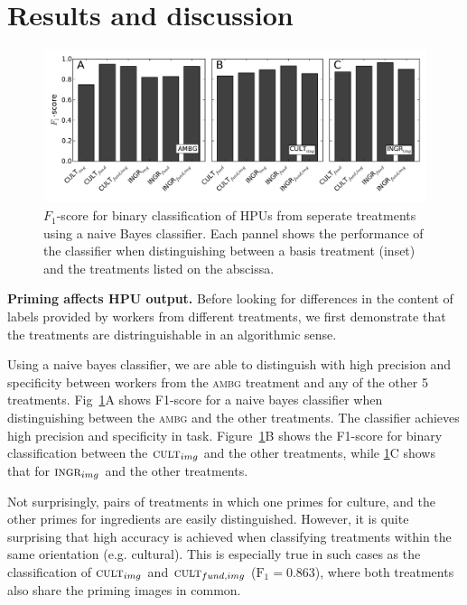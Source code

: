 \documentclass[letterpaper, 11pt, twocolumn]{article}
\begin{document}
\section*{Results and discussion}

\begin{figure}
	\begin{center}
		\includegraphics[scale=0.55]{../figs/f1scores.pdf}
		\caption{$F_1$-score for binary classification of HPUs from seperate
			treatments using a naive Bayes classifier.  Each pannel shows
			the performance of the classifier when distinguishing between 
			a basis treatment (inset) and the treatments listed on the 
			abscissa.
		}
		\label{fig:classifier}
	\end{center}
\end{figure}

\textbf{Priming affects HPU output.}
Before looking for differences in the content of labels provided by workers
from different treatments, we first demonstrate that the treatments are
distringuishable in an algorithmic sense.

Using a naive bayes classifier, we are able to distinguish with high precision
and specificity between workers from the \textsc{ambg} treatment and any of
the other 5 treatments.  Fig~\ref{fig:classifier}A shows F1-score for a
naive bayes classifier when distinguishing between the \textsc{ambg} and 
the other treatments. The classifier achieves high precision and specificity
in task.  Figure~\ref{fig:classifier}B shows the F1-score for binary
classification between the $\textsc{cult}_{img}$ and the other treatments, 
while \ref{fig:classifier}C shows that for $\textsc{ingr}_{img}$ and the other
treatments.  

Not surprisingly, pairs of treatments in which one primes for culture, and the
other primes for ingredients are easily distinguished.  However, it is quite
surprising that high accuracy is achieved when classifying treatments within 
the same orientation (e.g. cultural).  This is especially true in such cases as
the classification of  $\textsc{cult}_{img}$ and $\textsc{cult}_{fund,img}$
($\text{F}_1 = 0.863$), where both treatments also share the priming images in 
common.
\end{document}
